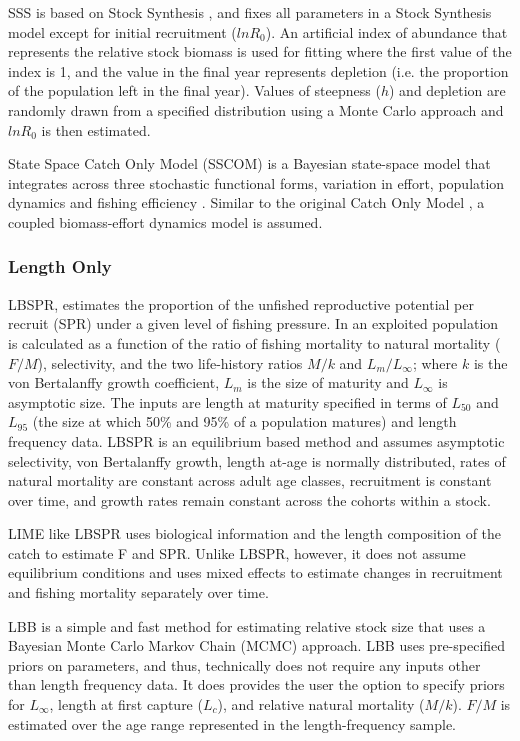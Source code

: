 SSS is based on Stock Synthesis  \citep{methot2013stock}, and fixes all parameters in a Stock Synthesis model except for initial recruitment ($lnR_0$). An artificial index of abundance that represents the relative stock biomass is used for fitting where the first value of the index is 1, and the value in the final year represents depletion (i.e. the proportion of the population left in the final year). Values of steepness ($h$) and depletion are randomly drawn from a specified distribution using a Monte Carlo approach and $lnR_0$ is then estimated. 

State Space Catch Only Model (SSCOM) is a Bayesian state-space model that integrates across three stochastic functional forms, variation in effort, population dynamics and fishing efficiency \citep{thorson2013new}. Similar to the original Catch Only Model \citep{vasconcellos2005overview}, a coupled biomass-effort dynamics model is assumed. 

\subsubsection*{Length Only}


LBSPR, estimates the proportion of the unfished reproductive potential per recruit  (SPR) under a given level of fishing pressure. In an exploited population is calculated as a function of the ratio of fishing mortality to natural mortality ($F/M$), selectivity, and the two life-history ratios $M/k$ and $L_m/L_{\infty}$; where $k$ is the von Bertalanffy growth coefficient, $L_m$ is the size of maturity and $L_{\infty}$ is asymptotic size. The inputs are length at maturity specified in terms of $L_{50}$ and $L_{95}$ (the size at which 50\% and 95\% of a population matures) and length frequency data. LBSPR is an equilibrium based method and assumes asymptotic selectivity, von Bertalanffy growth, length at-age is normally distributed, rates of natural mortality are constant across adult age classes, recruitment is constant over time, and growth rates remain constant across the cohorts within a stock. 

LIME like LBSPR uses biological information and the length composition of the catch to estimate F and SPR. Unlike LBSPR, however, it does not assume equilibrium conditions and uses mixed effects to  estimate changes in recruitment and fishing mortality separately over time. 

LBB is a simple and fast method for estimating relative stock size that uses a Bayesian Monte Carlo Markov Chain (MCMC) approach. LBB uses pre-specified priors on parameters, and thus, technically does not require any inputs other than length frequency data. It does provides the user the option to specify priors for $L_{\infty}$, length at first capture ($L_c$), and relative natural mortality ($M/k$). $F/M$ is estimated over the age range represented in the length-frequency sample. 


